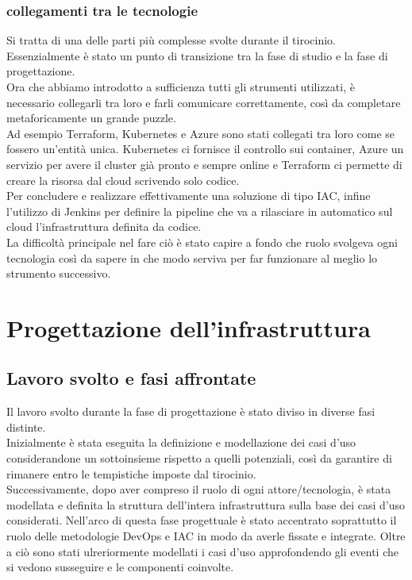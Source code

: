 \documentclass[a4paper,12pt]{report}
\begin{document}
\subsection{collegamenti tra le tecnologie}
Si tratta di una delle parti più complesse svolte durante il tirocinio. Essenzialmente è stato un punto di transizione tra la fase di studio e la fase di progettazione.\\
Ora che abbiamo introdotto a sufficienza tutti gli strumenti utilizzati, è necessario collegarli tra loro e farli comunicare correttamente, così da completare metaforicamente un grande puzzle.\\
Ad esempio Terraform, Kubernetes e Azure sono stati collegati tra loro come se fossero un'entità unica. Kubernetes ci fornisce il controllo sui container, Azure un servizio per avere il cluster già pronto e sempre online e Terraform ci permette di creare la risorsa dal cloud scrivendo solo codice. \\
Per concludere e realizzare effettivamente una soluzione di tipo IAC, infine l'utilizzo di Jenkins per definire la pipeline che va a rilasciare in automatico sul cloud l'infrastruttura definita da codice.\\
La difficoltà principale nel fare ciò è stato capire a fondo che ruolo svolgeva ogni tecnologia così da sapere in che modo serviva per far funzionare al meglio lo strumento successivo.
\chapter{Progettazione dell'infrastruttura}
\section{Lavoro svolto e fasi affrontate}
Il lavoro svolto durante la fase di progettazione è stato diviso in diverse fasi distinte.\\
Inizialmente è stata eseguita la definizione e modellazione dei casi d'uso considerandone un sottoinsieme rispetto a quelli potenziali, così da garantire di rimanere entro le tempistiche imposte dal tirocinio.\\
Successivamente, dopo aver compreso il ruolo di ogni attore/tecnologia, è stata modellata e definita la struttura dell'intera infrastruttura sulla base dei casi d'uso considerati. Nell'arco di questa fase progettuale è stato accentrato soprattutto il ruolo delle metodologie DevOps e IAC in modo da averle fissate e integrate. Oltre a ciò sono stati ulreriormente modellati i casi d'uso approfondendo gli eventi che si vedono susseguire e le componenti coinvolte. \\ \\ \\ \\ \\
\end{document}
